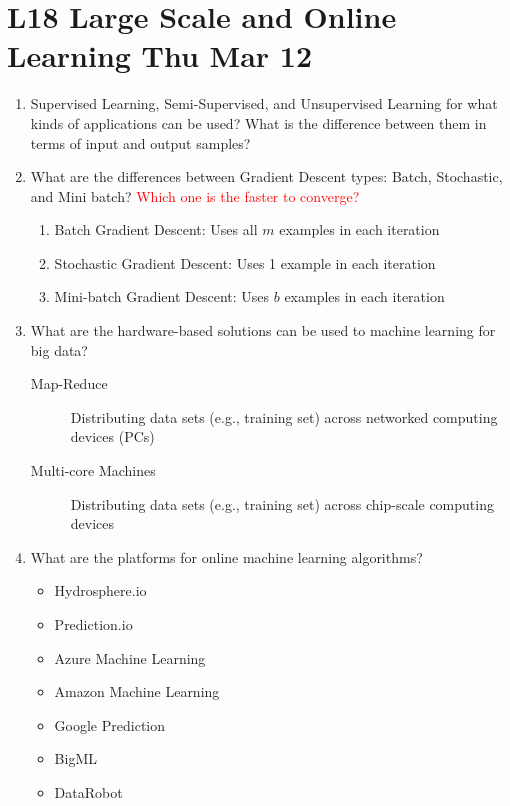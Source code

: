 \documentclass[12pt]{article}
\newenvironment{QandA}{\begin{enumerate}[label=\bfseries\arabic*.]\bfseries}
{\end{enumerate}}
\newenvironment{answered}{\par\normalfont\color{Sepia}}{}
\begin{document}
\section*{L18 Large Scale and Online Learning  \textemdash{} Thu Mar 12}
\begin{QandA}
    \color{red}
    \item Supervised Learning, Semi-Supervised, and Unsupervised Learning
          for what kinds of applications can be used?
          What is the difference between them in terms of input and output samples?
    \color{black}
    \begin{answered}
    \end{answered}


    \item What are the differences between Gradient Descent types: Batch, Stochastic, and Mini batch?
          \textcolor{red}{Which one is the faster to converge? }
    \begin{answered}
        \begin{enumerate}
            \item Batch Gradient Descent: Uses all $m$ examples in each iteration
            \item Stochastic Gradient Descent: Uses 1 example in each iteration
            \item Mini-batch Gradient Descent: Uses $b$ examples in each iteration
        \end{enumerate}

    \end{answered}

    \item What are the hardware-based solutions can be used to machine learning for big data?
    \begin{answered}
        \begin{description}
            \item[Map-Reduce] Distributing data sets (e.g., training set) across networked computing devices (PCs)
            \item[Multi-core Machines] Distributing data sets (e.g., training set) across chip-scale computing devices
        \end{description}
    \end{answered}

    \item What are the platforms for online machine learning algorithms?
    \begin{answered}
        \begin{itemize}
            \item Hydrosphere.io
            \item Prediction.io
            \item Azure Machine Learning
            \item Amazon Machine Learning
            \item Google Prediction
            \item BigML
            \item DataRobot
        \end{itemize}
    \end{answered}

\end{QandA}
\end{document}
